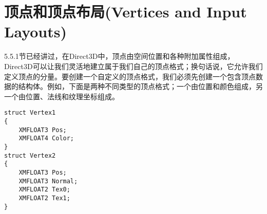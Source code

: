 \section{顶点和顶点布局(Vertices and Input Layouts)}
\begin{flushleft}
5.5.1节已经讲过，在Direct3D中，顶点由空间位置和各种附加属性组成，Direct3D可以让我们灵活地建立属于我们自己的顶点格式；换句话说，它允许我们定义顶点的分量。要创建一个自定义的顶点格式，我们必须先创建一个包含顶点数据的结构体。例如，下面是两种不同类型的顶点格式；一个由位置和颜色组成，另一个由位置、法线和纹理坐标组成。
\end{flushleft}
\begin{lstlisting}
struct Vertex1
{
    XMFLOAT3 Pos;
    XMFLOAT4 Color;
}
struct Vertex2
{
    XMFLOAT3 Pos;
    XMFLOAT3 Normal;
    XMFLOAT2 Tex0;
    XMFLOAT2 Tex1;
}
\end{lstlisting}
